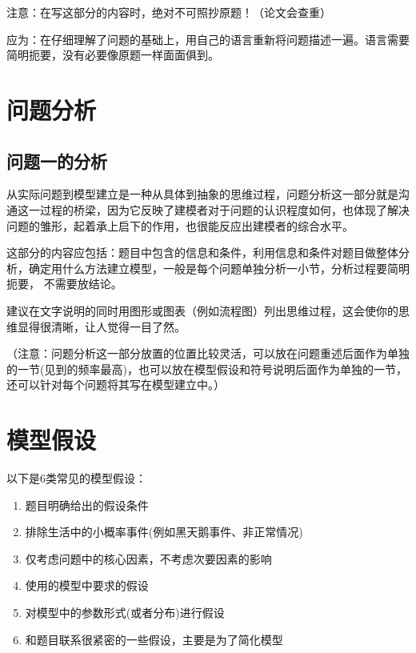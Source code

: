 注意：在写这部分的内容时，绝对不可照抄原题！（论文会查重）

应为：在仔细理解了问题的基础上，用自己的语言重新将问题描述一遍。语言需要简明扼要，没有必要像原题一样面面俱到。

\section{问题分析}
\subsection{问题一的分析}
从实际问题到模型建立是一种从具体到抽象的思维过程，问题分析这一部分就是沟通这一过程的桥梁，因为它反映了建模者对于问题的认识程度如何，也体现了解决问题的雏形，起着承上启下的作用，也很能反应出建模者的综合水平。

这部分的内容应包括：题目中包含的信息和条件，利用信息和条件对题目做整体分析，确定用什么方法建立模型，一般是每个问题单独分析一小节，分析过程要简明扼要， 不需要放结论。

建议在文字说明的同时用图形或图表（例如流程图）列出思维过程，这会使你的思维显得很清晰，让人觉得一目了然。

（注意：问题分析这一部分放置的位置比较灵活，可以放在问题重述后面作为单独的一节(见到的频率最高)，也可以放在模型假设和符号说明后面作为单独的一节，还可以针对每个问题将其写在模型建立中。）

\section{模型假设}
以下是6类常见的模型假设：
\begin{enumerate}
	\item 题目明确给出的假设条件
	\item 排除生活中的小概率事件(例如黑天鹅事件、非正常情况)
	\item 仅考虑问题中的核心因素，不考虑次要因素的影响
	\item 使用的模型中要求的假设
	\item 对模型中的参数形式(或者分布)进行假设
	\item 和题目联系很紧密的一些假设，主要是为了简化模型
\end{enumerate}

